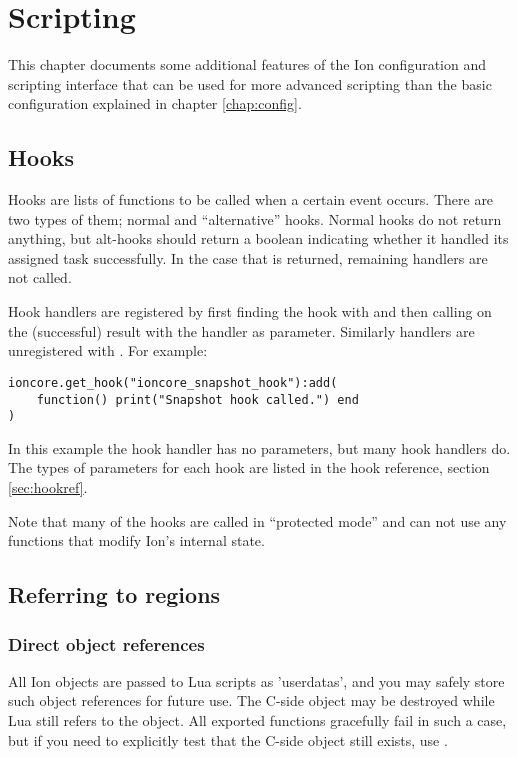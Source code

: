 
\chapter{Scripting}
\label{chap:tricks}

This chapter documents some additional features of the Ion configuration
and scripting interface that can be used for more advanced scripting than
the basic configuration explained in chapter \ref{chap:config}.

\section{Hooks}
\label{sec:hooks}

Hooks are lists of functions to be called when a certain event occurs.
There are two types of them; normal and ``alternative'' hooks. Normal
hooks do not return anything, but alt-hooks should return a boolean
indicating whether it handled its assigned task successfully. In the case
that  is returned, remaining handlers are not called.

Hook handlers are registered by first finding the hook
with  and then calling 
on the (successful) result with the handler as parameter. Similarly
handlers are unregistered with . For example:

\begin{verbatim}
ioncore.get_hook("ioncore_snapshot_hook"):add(
    function() print("Snapshot hook called.") end
)
\end{verbatim}

In this example the hook handler has no parameters, but many hook
handlers do. The types of parameters for each hook are listed in
the hook reference, section \ref{sec:hookref}.

Note that many of the hooks are called in ``protected mode'' and can not 
use any functions that modify Ion's internal state. 


\section{Referring to regions}

\subsection{Direct object references}

All Ion objects are passed to Lua scripts as 'userdatas', and you may
safely store such object references for future use. The C-side object
may be destroyed while Lua still refers to the object. All exported
functions gracefully fail in such a case, but if you need to explicitly
test that the C-side object still exists, use .

